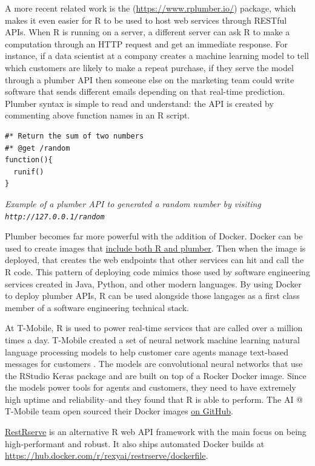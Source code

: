 A more recent related work is the 
(\url{https://www.rplumber.io/}) package, which makes it even easier for
R to be used to host web services through RESTful APIs. When R is
running on a server, a different server can ask R to make a computation
through an HTTP request and get an immediate response. For instance, if
a data scientist at a company creates a machine learning model to tell
which customers are likely to make a repeat purchase, if they serve the
model through a plumber API then someone else on the marketing team
could write software that sends different emails depending on that
real-time prediction. Plumber syntax is simple to read and understand:
the API is created by commenting above function names in an R script.

\begin{verbatim}
#* Return the sum of two numbers
#* @get /random
function(){
  runif()
}
\end{verbatim}

\emph{Example of a plumber API to generated a random number by visiting
\texttt{http://127.0.0.1/random}}

Plumber becomes far more powerful with the addition of Docker. Docker
can be used to create images that
\href{https://www.rplumber.io/docs/hosting.html\#docker}{include both R
and plumber}. Then when the image is deployed, that creates the web
endpoints that other services can hit and call the R code. This pattern
of deploying code mimics those used by software engineering services
created in Java, Python, and other modern languages. By using Docker to
deploy plumber APIs, R can be used alongside those langages as a first
class member of a software engineering technical stack.

At T-Mobile, R is used to power real-time services that are called over
a million times a day. T-Mobile created a set of neural network machine
learning natural language processing models to help customer care agents
manage text-based messages for customers
\citep{t-mobile_enterprise_2018}. The models are convolutional neural
networks that use the RStudio Keras package and are built on top of a
Rocker Docker image. Since the models power tools for agents and
customers, they need to have extremely high uptime and reliability--and
they found that R is able to perform. The AI @ T-Mobile team open
sourced their Docker images
\href{https://github.com/tmobile/r-tensorflow-api}{on GitHub}.

\href{http://restrserve.org}{RestRserve} is an alternative R web API
framework with the main focus on being high-performant and robust. It
also ships automated Docker builds at
\url{https://hub.docker.com/r/rexyai/restrserve/dockerfile}.

